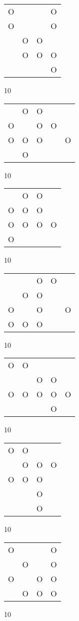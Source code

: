 \begin{tabular}{|m{0.2cm}m{0.2cm}m{0.2cm}m{0.2cm}|}\hline
O& & &O\\
O& & &O\\
 &O&O& \\
 &O&O&O\\
 & & &O\\
\hline\end{tabular}10
\begin{tabular}{|m{0.2cm}m{0.2cm}m{0.2cm}m{0.2cm}m{0.2cm}|}\hline
 &O&O& & \\
O& &O&O& \\
O&O&O& &O\\
 &O& & & \\
\hline\end{tabular}10
\begin{tabular}{|m{0.2cm}m{0.2cm}m{0.2cm}m{0.2cm}|}\hline
 &O&O& \\
O&O&O& \\
O&O&O&O\\
O& & & \\
\hline\end{tabular}10
\begin{tabular}{|m{0.2cm}m{0.2cm}m{0.2cm}m{0.2cm}m{0.2cm}|}\hline
 & &O&O& \\
 &O&O& & \\
O& &O& &O\\
O&O&O& & \\
\hline\end{tabular}10
\begin{tabular}{|m{0.2cm}m{0.2cm}m{0.2cm}m{0.2cm}m{0.2cm}|}\hline
O&O& & & \\
 & &O&O& \\
O&O&O&O&O\\
 & & &O& \\
\hline\end{tabular}10
\begin{tabular}{|m{0.2cm}m{0.2cm}m{0.2cm}m{0.2cm}|}\hline
O&O& & \\
 &O&O&O\\
O&O&O& \\
 & &O& \\
 & &O& \\
\hline\end{tabular}10
\begin{tabular}{|m{0.2cm}m{0.2cm}m{0.2cm}m{0.2cm}|}\hline
O& & &O\\
 &O& &O\\
O& &O&O\\
 &O&O&O\\
\hline\end{tabular}10

